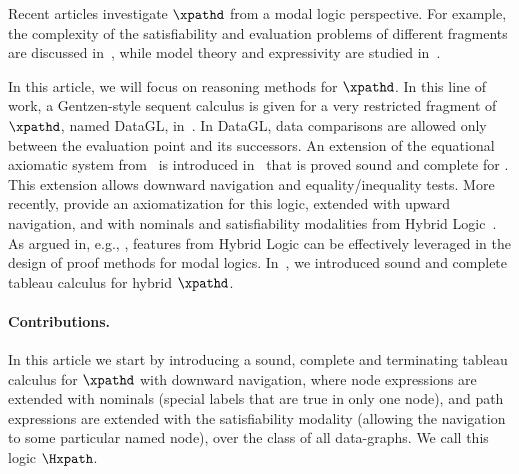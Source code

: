 \documentclass[10pt,a4paper]{amsart}
\theoremstyle{definition}
\theoremstyle{remark}
\begin{document}
Recent articles investigate $\xpathd$ from a modal logic perspective.  
For example, the complexity of the satisfiability and evaluation problems of different fragments are discussed
in~\cite{FigPhD,FigueiraS11,Figueira12ACM,Fig13}, while model theory and
expressivity are studied
in~\cite{ADF14,ICDT14,ICDT14Jair,ADF14journal,KR16,GonzalezA21}.  

In this article, we will focus on reasoning methods for $\xpathd$. 
In this line of work, a Gentzen-style sequent calculus is given for a
very restricted fragment of $\xpathd$, named DataGL, in~\cite{BaeldeLS15}. In DataGL, data
comparisons are allowed only between the evaluation point and its
successors. An extension of the equational axiomatic system
from~\cite{cateLM10} is introduced in~\cite{ADFF16report} that is proved sound and complete for \xpathd. This extension allows
downward navigation and equality/inequality tests.
More recently, \cite{ArecF:hilb16,ArecesF21} provide an axiomatization for this logic,
extended with upward navigation, and with nominals and satisfiability
modalities from Hybrid Logic~\cite{arec:hybr05b}. As argued in, e.g., \cite{Brauner07}, features from Hybrid Logic can be effectively leveraged in the design of proof methods for modal logics.  In~\cite{ArecesFS17},
we introduced sound and complete tableau calculus for hybrid $\xpathd$.


\paragraph{Contributions.}  
In this article we start by introducing a sound, complete and terminating tableau
calculus for $\xpathd$ with downward navigation, where node expressions
are extended with nominals (special labels that are true in only one
node), and path expressions are extended with the satisfiability modality
(allowing the navigation to some particular named node), over the class of all data-graphs. We call this
logic $\Hxpath$. 
\end{document}
